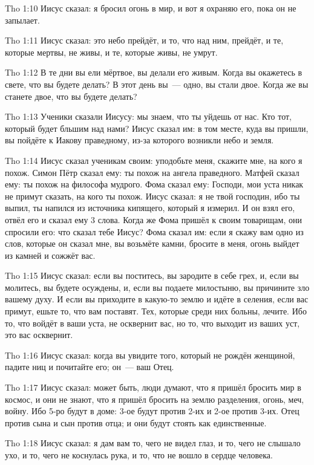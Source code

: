 \vs Tho 1:10
Иисус сказал:
я бросил огонь в мир, и вот я охраняю его, пока он не запылает.

\vs Tho 1:11
Иисус сказал:
это небо прейдёт, и то, что над ним, прейдёт,
и те, которые мертвы, не живы, и те, которые живы, не умрут.

\vs Tho 1:12
В те дни вы ели мёртвое, вы делали его живым.
Когда вы окажетесь в свете, что вы будете делать?
В этот день вы~--- одно, вы стали двое.
Когда же вы станете двое, что вы будете делать?

\vs Tho 1:13
Ученики сказали Иисусу:
мы знаем, что ты уйдешь от нас.
Кто тот, который будет бльшим над нами?
Иисус сказал им:
в том месте, куда вы пришли, вы пойдёте к Иакову праведному,
из-за которого возникли небо и земля.

\vs Tho 1:14
Иисус сказал ученикам своим:
уподобьте меня, скажите мне, на кого я похож.
Симон Пётр сказал ему:
ты похож на ангела праведного.
Матфей сказал ему: ты похож на философа мудрого.
Фома сказал ему:
Господи, мои уста никак не примут сказать, на кого ты похож.
Иисус сказал:
я не твой господин, ибо ты выпил,
ты напился из источника кипящего, который я измерил.
И он взял его, отвёл его и сказал ему 3 слова.
Когда же Фома пришёл к своим товарищам, они спросили его:
что сказал тебе Иисус?
Фома сказал им: если я скажу вам одно из слов,
которые он сказал мне, вы возьмёте камни, бросите в меня,
огонь выйдет из камней и сожжёт вас.

\vs Tho 1:15
Иисус сказал:
если вы поститесь, вы зародите в себе грех,
и, если вы молитесь, вы будете осуждены,
и, если вы подаете милостыню, вы причините зло вашему духу.
И если вы приходите в какую-то землю и идёте в селения,
если вас примут, ешьте то, что вам поставят.
Тех, которые среди них больны, лечите.
Ибо то, что войдёт в ваши уста, не осквернит вас,
но то, что выходит из ваших уст, это вас осквернит.

\vs Tho 1:16
Иисус сказал:
когда вы увидите того, который не рождён женщиной,
падите ниц и почитайте его; он~--- ваш Отец.

\vs Tho 1:17
Иисус сказал:
может быть, люди думают, что я пришёл бросить мир в космос,
и они не знают, что я пришёл бросить на землю разделения,
огонь, меч, войну.
Ибо 5-ро будут в доме: 3-ое будут против 2-их и 2-ое против 3-их.
Отец против сына и сын против отца; и они будут стоять как единственные.

\vs Tho 1:18
Иисус сказал: я дам вам то, чего не видел глаз,
и то, чего не слышало ухо,
и то, чего не коснулась рука,
и то, что не вошло в сердце человека.

